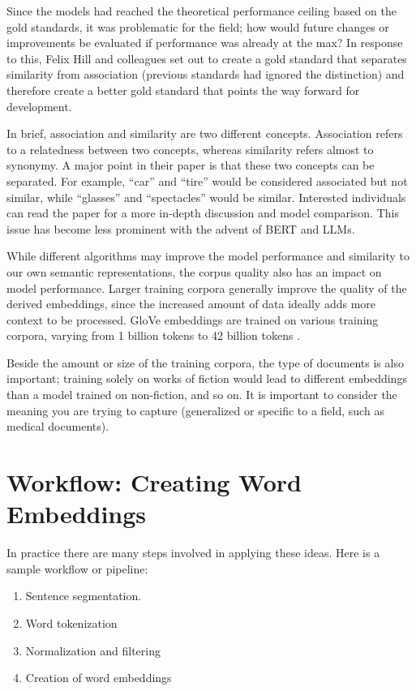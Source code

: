 Since the models had reached the theoretical performance ceiling based on the gold standards, it was problematic for the field; how would future changes or improvements be evaluated if performance was already at the max?
In response to this, Felix Hill and colleagues \cite{hill2015simlex} set out to create a gold standard that separates similarity from association (previous standards had ignored the distinction) and therefore create a better gold standard that points the way forward for development. 

In brief, association and similarity are two different concepts. Association refers to a relatedness between two concepts, whereas similarity refers almost to synonymy. A major point in their paper \cite{hill2015simlex} is that these two concepts can be separated.
For example, ``car'' and ``tire'' would be considered associated but not similar, while ``glasses'' and ``spectacles'' would be similar.
Interested individuals can read the paper for a more in-depth discussion and model comparison. This issue has become less prominent with the advent of BERT and LLMs.

While different algorithms may improve the model performance and similarity to our own semantic representations, the corpus quality also has an impact on model performance.
Larger training corpora generally improve the quality of the derived embeddings, since the increased amount of data ideally adds more context to be processed. 
GloVe embeddings are trained on various training corpora, varying from 1 billion tokens to 42 billion tokens \cite{pennington2014glove}.

Beside the amount or size of the training corpora, the type of documents is also important; training solely on works of fiction would lead to different embeddings than a model trained on non-fiction, and so on. It is important to consider the meaning you are trying to capture (generalized or specific to a field, such as medical documents).

\section{Workflow: Creating Word Embeddings}\label{createWordEmbeddings}

In practice there are many steps involved in applying these ideas. Here is a sample workflow or pipeline:
\begin{enumerate}
\item Sentence segmentation.
\item Word tokenization
\item Normalization and filtering
\item Creation of word embeddings
\end{enumerate}


